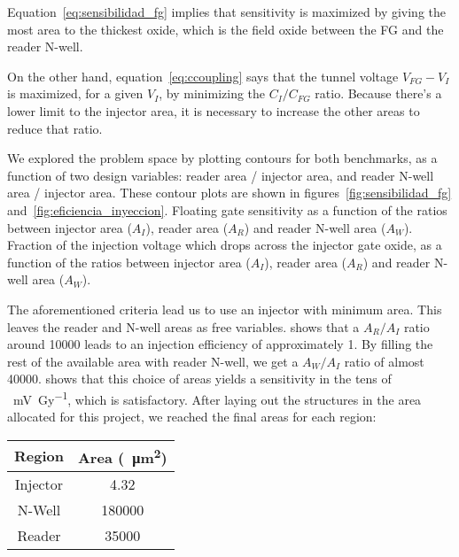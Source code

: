 Equation~\ref{eq:sensibilidad_fg} implies that sensitivity is maximized
by giving the most area to the thickest oxide,
which is the field oxide between the FG and the reader N-well.

On the other hand, equation~\ref{eq:ccoupling}
says that the tunnel voltage $V_{FG}-V_I$
is maximized, for a given $V_I$,
by minimizing the $C_I/C_{FG}$ ratio.
Because there's a lower limit to the injector area,
it is necessary to increase the other areas to reduce that ratio.

We explored the problem space by plotting contours for both benchmarks,
as a function of two design variables:
reader area / injector area,
and reader N-well area / injector area.
These contour plots are shown in figures~\ref{fig:sensibilidad_fg}
and~\ref{fig:eficiencia_inyeccion}.
{Floating gate sensitivity 
as a function of the ratios between
injector area ($A_I$),
reader area ($A_R$) 
and reader N-well area ($A_W$).}
{Fraction of the injection voltage which drops across the injector gate oxide,
as a function of the ratios between
injector area ($A_I$),
reader area ($A_R$) 
and reader N-well area ($A_W$).}

The aforementioned criteria lead us to use an injector with minimum area.
This leaves the reader and N-well areas as free variables.
shows that a $A_R/A_I$ ratio around 10000
leads to an injection efficiency of approximately 1.
By filling the rest of the available area with reader N-well,
we get a $A_W/A_I$ ratio of almost 40000.
 shows that this choice of areas
yields a sensitivity in the tens of \SI{}{\milli\volt\per\gray},
which is satisfactory.
After laying out the structures in the area allocated for this project,
we reached the final areas for each region:
\begin{table}[h]
\centering
\begin{tabular}{|c|c|}
    \hline
    Region   & Area (\SI{}{\micro\meter\squared})\\ \hline
    Injector \vspace{0.5cm}& 4.32\\
N-Well     & 180000\\
Reader   & 35000\\
\hline
\end{tabular}
\end{table}
%
